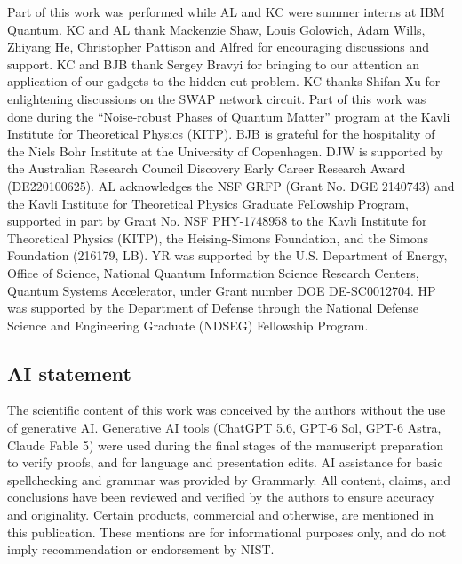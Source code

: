 \documentclass[11pt]{article}
\begin{document}
Part of this work was performed while AL and KC were summer interns at IBM Quantum.
KC and AL thank Mackenzie Shaw, Louis Golowich, Adam Wills, Zhiyang He, Christopher Pattison and Alfred for encouraging discussions and support. 
KC and BJB thank Sergey Bravyi for bringing to our attention an application of our gadgets to the hidden cut problem.
KC thanks Shifan Xu for enlightening discussions on the SWAP network circuit.
Part of this work was done during the ``Noise-robust Phases of Quantum Matter'' program at the Kavli Institute for Theoretical Physics (KITP).
BJB is grateful for the hospitality of the Niels Bohr Institute at the University of Copenhagen.
DJW is supported by the Australian Research Council Discovery Early Career Research Award (DE220100625). 
AL acknowledges the NSF GRFP (Grant No. DGE 2140743) and the Kavli Institute for Theoretical Physics Graduate Fellowship Program, supported in part by Grant No. NSF PHY-1748958 to the Kavli Institute for Theoretical Physics (KITP), the Heising-Simons Foundation, and the Simons Foundation (216179, LB).
YR was supported by the U.S.
Department of Energy, Office of Science, National Quantum Information Science Research Centers, Quantum Systems Accelerator, under Grant
number DOE DE-SC0012704.
HP was supported by the Department of Defense through the National Defense Science and Engineering Graduate (NDSEG) Fellowship Program.

\subsection*{AI statement}


The scientific content of this work was conceived by the authors without the use of generative AI. 
Generative AI tools (ChatGPT 5.6, GPT-6 Sol, GPT-6 Astra, Claude Fable 5) were used during the final stages of the manuscript preparation to verify proofs, and for language and presentation edits. AI assistance for basic spellchecking and grammar was provided by Grammarly. 
All
content, claims, and conclusions have been reviewed and
verified by the authors to ensure accuracy and originality. 
Certain products, commercial and otherwise, are
mentioned in this publication. These mentions are for
informational purposes only, and do not imply recommendation or endorsement by NIST.



\ifdefined\ismainfile
\else
    
\end{document}
